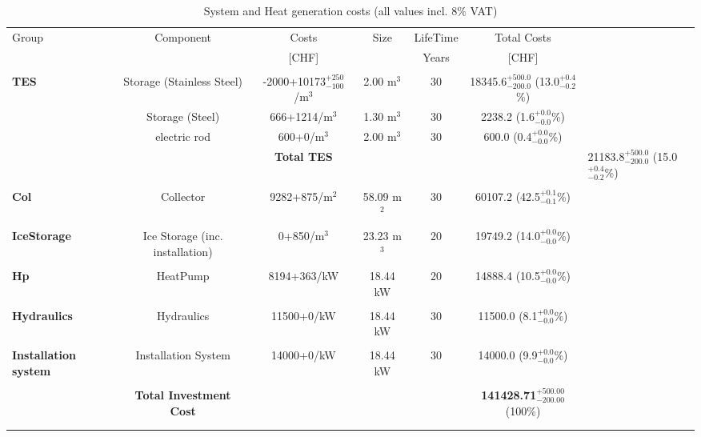 \documentclass[english]{SPFShortReport}
\begin{document}
\begin{table}[!ht]
\centering
\caption{System and Heat generation costs (all values incl. 8$\%$ VAT) }
\begin{adjustbox}{max width =\textwidth}
\begin{tabular}{l | c c c c c } 
\hline
\hline
Group &Component &Costs &Size &LifeTime &Total Costs \\ 
 & &[CHF] & &Years &[CHF]\\ 
\hline
\\
\textbf{TES} & Storage (Stainless Steel) & -2000+10173$^{\mathrm{+250}}_{\mathrm{-100}}$/m$^3$ & 2.00 m$^3$ & 30 & 18345.6$^{\mathrm{+500.0}}_{\mathrm{-200.0}}$ (13.0$^{\mathrm{+0.4}}_{\mathrm{-0.2}}$\%) \\
 & Storage (Steel) & 666+1214/m$^3$ & 1.30 m$^3$ & 30 & 2238.2 (1.6$^{\mathrm{+0.0}}_{\mathrm{-0.0}}$\%) \\
 & electric rod & 600+0/m$^3$ & 2.00 m$^3$ & 30 & 600.0 (0.4$^{\mathrm{+0.0}}_{\mathrm{-0.0}}$\%) \\
&
 & \textbf{Total TES} & & & & 21183.8$^{\mathrm{+500.0}}_{\mathrm{-200.0}}$ (15.0$^{\mathrm{+0.4}}_{\mathrm{-0.2}}$\%) \\
\hline \\
\textbf{Col} & Collector & 9282+875/m$^2$ & 58.09 m$^2$ & 30 & 60107.2 (42.5$^{\mathrm{+0.1}}_{\mathrm{-0.1}}$\%) \\
\hline \\
\textbf{IceStorage} & Ice Storage (inc. installation) & 0+850/m$^3$ & 23.23 m$^3$ & 20 & 19749.2 (14.0$^{\mathrm{+0.0}}_{\mathrm{-0.0}}$\%) \\
\hline \\
\textbf{Hp} & HeatPump & 8194+363/kW & 18.44 kW & 20 & 14888.4 (10.5$^{\mathrm{+0.0}}_{\mathrm{-0.0}}$\%) \\
\hline \\
\textbf{Hydraulics} & Hydraulics & 11500+0/kW & 18.44 kW & 30 & 11500.0 (8.1$^{\mathrm{+0.0}}_{\mathrm{-0.0}}$\%) \\
\hline \\
\textbf{Installation system} & Installation System & 14000+0/kW & 18.44 kW & 30 & 14000.0 (9.9$^{\mathrm{+0.0}}_{\mathrm{-0.0}}$\%) \\
\hline \\
 & \textbf{Total Investment Cost} & & & & \textbf{141428.71$^{\mathrm{+500.00}}_{\mathrm{-200.00}}$} (100\%) \\ 
\hline \\ 
\hline \\ 

\end{tabular}
\end{adjustbox}
\end{table}
\end{document}
